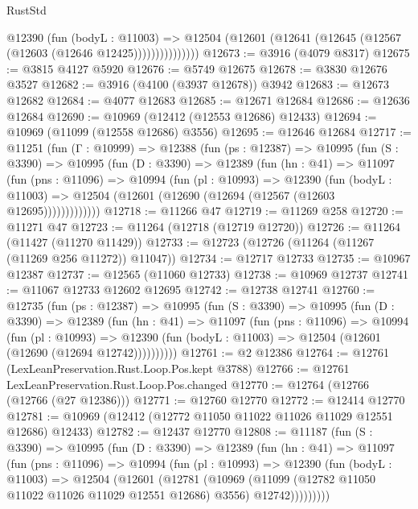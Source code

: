\begin{lexlean}{RustStd}
\begin{coremodule}
                  @12390
                    (fun (bodyL : @11003) =>
                    @12504 (@12601 (@12641 (@12645 (@12567 (@12603 (@12646 @12425)))))))))))))))
@12673 := @3916 (@4079 @8317)
@12675 := @3815 @4127 @5920
@12676 := @5749 @12675
@12678 := @3830 @12676 @3527
@12682 := @3916 (@4100 (@3937 @12678)) @3942
@12683 := @12673 @12682
@12684 := @4077 @12683
@12685 := @12671 @12684
@12686 := @12636 @12684
@12690 := @10969 (@12412 (@12553 @12686) @12433)
@12694 := @10969 (@11099 (@12558 @12686) @3556)
@12695 := @12646 @12684
@12717 := @11251
    (fun (Γ : @10999) =>
    @12388
      (fun (ps : @12387) =>
      @10995
        (fun (S : @3390) =>
        @10995
          (fun (D : @3390) =>
          @12389
            (fun (hn : @41) =>
            @11097
              (fun (pns : @11096) =>
              @10994
                (fun (pl : @10993) =>
                @12390
                  (fun (bodyL : @11003) =>
                  @12504 (@12601 (@12690 (@12694 (@12567 (@12603 @12695)))))))))))))
@12718 := @11266 @47
@12719 := @11269 @258
@12720 := @11271 @47
@12723 := @11264 (@12718 (@12719 @12720))
@12726 := @11264 (@11427 (@11270 @11429))
@12733 := @12723 (@12726 (@11264 (@11267 (@11269 @256 @11272)) @11047))
@12734 := @12717 @12733
@12735 := @10967 @12387
@12737 := @12565 (@11060 @12733)
@12738 := @10969 @12737
@12741 := @11067 @12733 @12602 @12695
@12742 := @12738 @12741
@12760 := @12735
    (fun (ps : @12387) =>
    @10995
      (fun (S : @3390) =>
      @10995
        (fun (D : @3390) =>
        @12389
          (fun (hn : @41) =>
          @11097
            (fun (pns : @11096) =>
            @10994
              (fun (pl : @10993) =>
              @12390 (fun (bodyL : @11003) => @12504 (@12601 (@12690 (@12694 @12742))))))))))
@12761 := @2 @12386
@12764 := @12761 (LexLeanPreservation.Rust.Loop.Pos.kept @3788)
@12766 := @12761 LexLeanPreservation.Rust.Loop.Pos.changed
@12770 := @12764 (@12766 (@12766 (@27 @12386)))
@12771 := @12760 @12770
@12772 := @12414 @12770
@12781 := @10969 (@12412 (@12772 @11050 @11022 @11026 @11029 @12551 @12686) @12433)
@12782 := @12437 @12770
@12808 := @11187
    (fun (S : @3390) =>
    @10995
      (fun (D : @3390) =>
      @12389
        (fun (hn : @41) =>
        @11097
          (fun (pns : @11096) =>
          @10994
            (fun (pl : @10993) =>
            @12390
              (fun (bodyL : @11003) =>
              @12504
                (@12601
                  (@12781
                    (@10969
                      (@11099 (@12782 @11050 @11022 @11026 @11029 @12551 @12686) @3556)
                      @12742)))))))))

\end{coremodule}
\end{lexlean}
